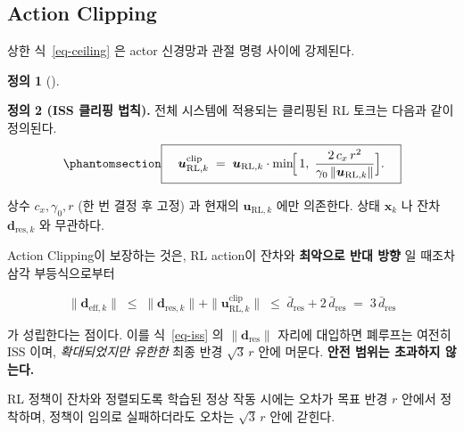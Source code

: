 \documentclass[
  11pt,
]{article}
\theoremstyle{plain}
\theoremstyle{plain}
\theoremstyle{definition}
\newtheorem{definition}{정의}[section]
\theoremstyle{remark}
\begin{document}
\subsection{Action Clipping}\label{sec-cliplaw}

상한 식~\ref{eq-ceiling} 은 actor 신경망과 관절 명령 사이에 강제된다.

\begin{definition}[]\protect\hypertarget{def-clip}{}\label{def-clip}

\textbf{정의 2 (ISS 클리핑 법칙).} 전체 시스템에 적용되는 클리핑된 RL
토크는 다음과 같이 정의된다.
\begin{equation}\protect\phantomsection\label{eq-clip}{
\boxed{\quad
\bm{u}_{\mathrm{RL},k}^{\mathrm{clip}}
\;=\;
\bm{u}_{\mathrm{RL},k}\cdot
\min\!\Bigl[\,1,\;
\frac{2\,c_x\,r^2}{\gamma_0\,\|\bm{u}_{\mathrm{RL},k}\|}
\Bigr].
\quad}
}\end{equation}

\end{definition}

상수 \(c_x, \gamma_0, r\) (한 번 결정 후 고정) 과 현재의
\(\bm{u}_{\mathrm{RL},k}\) 에만 의존한다. 상태 \(\bm{x}_k\) 나 잔차
\(\bm{d}_{\mathrm{res},k}\) 와 무관하다.

Action Clipping이 보장하는 것은, RL action이 잔차와 \textbf{최악으로
반대 방향} 일 때조차 삼각 부등식으로부터

\[
\|\bm{d}_{\mathrm{eff},k}\|
\;\le\;
\|\bm{d}_{\mathrm{res},k}\| + \|\bm{u}_{\mathrm{RL},k}^{\mathrm{clip}}\|
\;\le\;
\bar{d}_{\mathrm{res}} + 2\,\bar{d}_{\mathrm{res}}
\;=\;
3\,\bar{d}_{\mathrm{res}}
\]

가 성립한다는 점이다. 이를 식~\ref{eq-iss} 의
\(\|\bm{d}_{\mathrm{res}}\|\) 자리에 대입하면 폐루프는 여전히 ISS 이며,
\emph{확대되었지만 유한한} 최종 반경 \(\sqrt{3}\,r\) 안에 머문다.
\textbf{안전 범위는 초과하지 않는다.}

\begin{tcolorbox}[enhanced jigsaw, arc=.35mm, bottomrule=.15mm, bottomtitle=1mm, breakable, colback=white, colbacktitle=quarto-callout-tip-color!10!white, colframe=quarto-callout-tip-color-frame, coltitle=black, left=2mm, leftrule=.75mm, opacityback=0, opacitybacktitle=0.6, rightrule=.15mm, title=\textcolor{quarto-callout-tip-color}{\faLightbulb}\hspace{0.5em}{클립이 보장하는 것 (한 문장)}, titlerule=0mm, toprule=.15mm, toptitle=1mm]

RL 정책이 잔차와 정렬되도록 학습된 정상 작동 시에는 오차가 목표 반경
\(r\) 안에서 정착하며, 정책이 임의로 실패하더라도 오차는 \(\sqrt{3}\,r\)
안에 갇힌다.

\end{tcolorbox}
\end{document}
